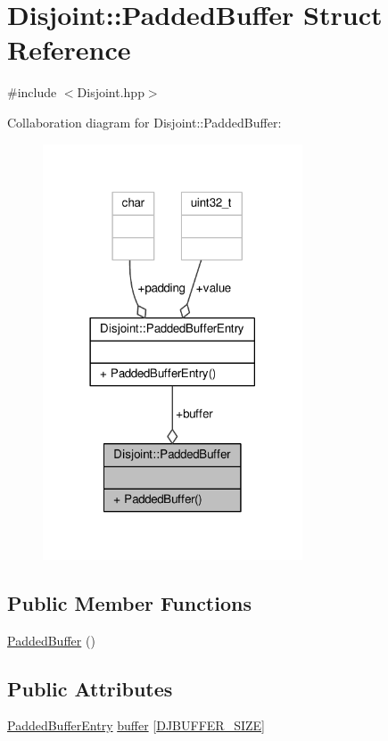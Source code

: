 \hypertarget{structDisjoint_1_1PaddedBuffer}{\section{Disjoint\-:\-:Padded\-Buffer Struct Reference}
\label{structDisjoint_1_1PaddedBuffer}
}


{\ttfamily \#include $<$Disjoint.\-hpp$>$}



Collaboration diagram for Disjoint\-:\-:Padded\-Buffer\-:
\nopagebreak
\begin{figure}[H]
\begin{center}
\leavevmode
\includegraphics[width=218pt]{structDisjoint_1_1PaddedBuffer__coll__graph}
\end{center}
\end{figure}
\subsection*{Public Member Functions}
\begin{DoxyCompactItemize}
\item 
\hyperlink{structDisjoint_1_1PaddedBuffer_abcae462c227d6dd2c09f124d67e03936}{Padded\-Buffer} ()
\end{DoxyCompactItemize}
\subsection*{Public Attributes}
\begin{DoxyCompactItemize}
\item 
\hyperlink{structDisjoint_1_1PaddedBufferEntry}{Padded\-Buffer\-Entry} \hyperlink{structDisjoint_1_1PaddedBuffer_a4772d8ae3cb0d874f3824762484e3319}{buffer} \mbox{[}\hyperlink{structDisjoint_a3514072cfe176cf5953ee3a7444a3c7c}{D\-J\-B\-U\-F\-F\-E\-R\-\_\-\-S\-I\-Z\-E}\mbox{]}
\end{DoxyCompactItemize}


